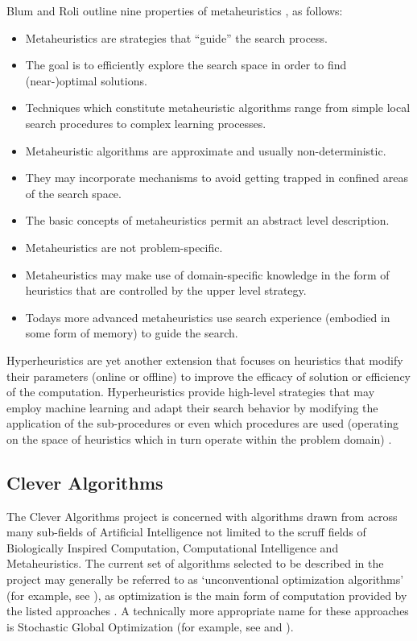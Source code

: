 Blum and Roli outline nine properties of metaheuristics \cite{Blum2003}, as follows: 
\begin{itemize}
	\item Metaheuristics are strategies that ``guide'' the search process.
	\item The goal is to efficiently explore the search space in order to find (near-)optimal solutions.
	\item Techniques which constitute metaheuristic algorithms range from simple local search procedures to complex learning processes.
	\item Metaheuristic algorithms are approximate and usually non-deterministic.
	\item They may incorporate mechanisms to avoid getting trapped in confined areas of the search space.
	\item The basic concepts of metaheuristics permit an abstract level description.
	\item Metaheuristics are not problem-specific.
	\item Metaheuristics may make use of domain-specific knowledge in the form of heuristics that are controlled by the upper level strategy.
	\item Todays more advanced metaheuristics use search experience (embodied in some form of memory) to guide the search.
\end{itemize}

Hyperheuristics are yet another extension that focuses on heuristics that modify their parameters (online or offline) to improve the efficacy of solution or efficiency of the computation. Hyperheuristics provide high-level strategies that may employ machine learning and adapt their search behavior by modifying the application of the sub-procedures or even which procedures are used (operating on the space of heuristics which in turn operate within the problem domain) \cite{Burke2003a, Burke2003}. 

% 
% 
\subsection{Clever Algorithms}
\label{sec:clever_algorithms}
The Clever Algorithms project is concerned with algorithms drawn from across many sub-fields of Artificial Intelligence not limited to the scruff fields of Biologically Inspired Computation, Computational Intelligence and Metaheuristics. 
The current set of algorithms selected to be described in the project may generally be referred to as `unconventional optimization algorithms' (for example, see \cite{Corne1999}), as optimization is the main form of computation provided by the listed approaches \cite{Brownlee2010b}. A technically more appropriate name for these approaches is Stochastic Global Optimization (for example, see \cite{Weise2007} and \cite{Luke2009}).

